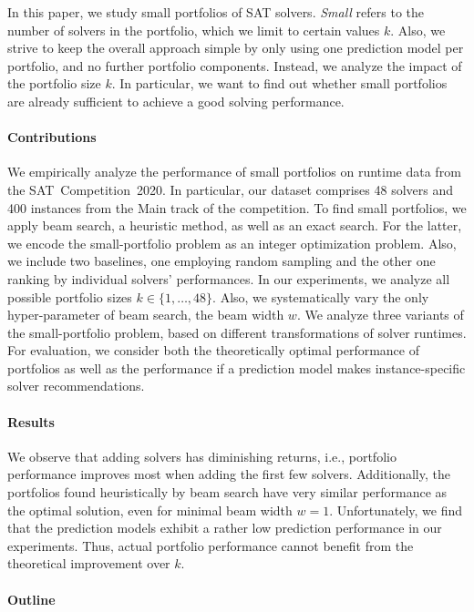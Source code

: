 \documentclass[conference]{IEEEtran}
\begin{document}
In this paper, we study small portfolios of SAT solvers.
\emph{Small} refers to the number of solvers in the portfolio, which we limit to certain values $k$.
Also, we strive to keep the overall approach simple by only using one prediction model per portfolio, and no further portfolio components. 
Instead, we analyze the impact of the portfolio size $k$. 
In particular, we want to find out whether small portfolios are already sufficient to achieve a good solving performance. 

\paragraph{Contributions}

We empirically analyze the performance of small portfolios on runtime data from the SAT~Competition~2020. 
In particular, our dataset comprises 48 solvers and 400 instances from the Main track of the competition.
To find small portfolios, we apply beam search, a heuristic method, as well as an exact search. 
For the latter, we encode the small-portfolio problem as an integer optimization problem. 
Also, we include two baselines, one employing random sampling and the other one ranking by individual solvers' performances.
In our experiments, we analyze all possible portfolio sizes $k \in \{1, \dots, 48\}$. 
Also, we systematically vary the only hyper-parameter of beam search, the beam width $w$.
We analyze three variants of the small-portfolio problem, based on different transformations of solver runtimes.
For evaluation, we consider both the theoretically optimal performance of portfolios as well as the performance if a prediction model makes instance-specific solver recommendations. 

\paragraph{Results}

We observe that adding solvers has diminishing returns, i.e., portfolio performance improves most when adding the first few solvers. 
Additionally, the portfolios found heuristically by beam search have very similar performance as the optimal solution, even for minimal beam width $w=1$.
Unfortunately, we find that the prediction models exhibit a rather low prediction performance in our experiments. 
Thus, actual portfolio performance cannot benefit from the theoretical improvement over $k$. 

\paragraph{Outline}
\end{document}
